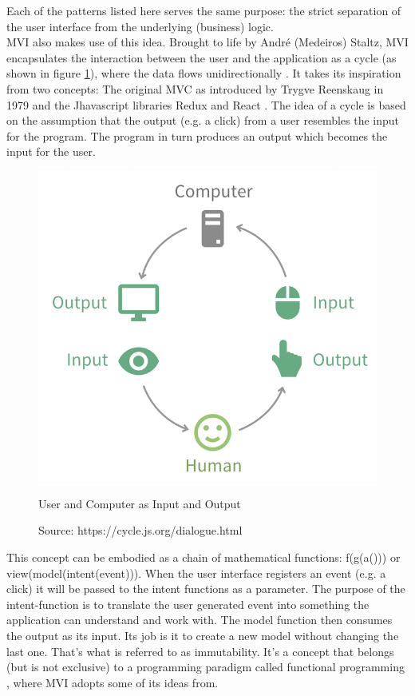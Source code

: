 Each of the patterns listed here serves the same purpose: the strict separation of the user interface from the underlying (business) logic.
\\
MVI also makes use of this idea. Brought to life by André (Medeiros) Staltz, MVI encapsulates the interaction between the user and the application as a cycle 
(as shown in figure 
\ref{fig:userComputerInputOutput}), 
where the data flows unidirectionally 
\cite{unidirectionalDataFlowRedux}.
It takes its inspiration from two concepts: The original MVC as introduced by Trygve Reenskaug in 1979 
\cite{wikipediaTrygveReenskaug} 
and the Jhavascript libraries Redux 
\cite{redux} 
and React 
\cite{react}. 
The idea of a cycle is based on the assumption that the output (e.g. a click) from a user resembles the input for the program. The program in turn produces an output 
which becomes the input for the user.
\begin{figure}[ht]
    \centering
    \includegraphics[height=0.5\textwidth]{./images/mvi-cycle}
    \caption{User and Computer as Input and Output}
    \caption*{Source: https://cycle.js.org/dialogue.html}
    \label{fig:userComputerInputOutput}
\end{figure}
This concept can be embodied as a chain of mathematical functions: f(g(a())) or view(model(intent(event))).
When the user interface registers an event (e.g. a click) it will be passed to the intent functions as a parameter. 
The purpose of the intent-function is to translate the user generated event into something the application can understand and work with.
The model function then consumes the output as its input. Its job is it to create a new model without changing the last one. That's what is referred to as immutability. 
\cite{immutableObjectsEffectiveJava}
It's a concept that belongs (but is not exclusive) to a programming paradigm called functional programming
\cite{functionalProgrammingWikiHaskell,functionalProgrammingPractical,programmingInHaskellFunctionalProgrammingDefinition},
where MVI adopts some of its ideas from.\\

